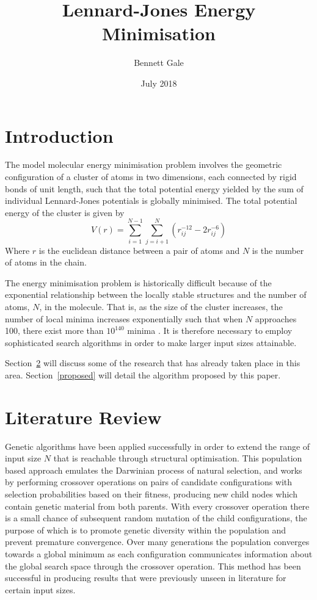 \documentclass{article}
\title{Lennard-Jones Energy Minimisation}
\author{Bennett Gale}
\date{July 2018}
\begin{document}
\maketitle
\tableofcontents
\pagebreak

\section{Introduction}

The model molecular energy minimisation problem involves the geometric
configuration of a cluster of atoms in two dimensions, each connected by rigid
bonds of unit length, such that the total potential energy yielded by the sum of
individual Lennard-Jones potentials is globally minimised. The total potential
energy of the cluster is given by 
$$V(r)=\sum^{N-1}_{i=1}\sum^{N}_{j=i+1}\left(r^{-12}_{ij}-2r^{-6}_{ij}\right)$$
Where $r$ is the euclidean distance between a pair of atoms and $N$ is the
number of atoms in the chain.

The energy minimisation problem is historically difficult because of the
exponential relationship between the locally stable structures and the number of
atoms, $N$, in the molecule. That is, as the size of the cluster increases, the
number of local minima increases exponentially such that when $N$ approaches
100, there exist more than $10^{140}$ minima \cite{DAVEN1996195}. It is
therefore necessary to employ sophisticated search algorithms in order to make
larger input sizes attainable.

Section~\ref{litreview} will discuss some of the research that has already taken
place in this area. Section~\ref{proposed} will detail the algorithm proposed by
this paper.

\section{Literature Review} \label{litreview}

Genetic algorithms have been applied \cite{doi:10.1002/qua.560440214,
PULLAN1998331} successfully in order to extend the range of input size $N$ that
is reachable through structural optimisation. This population based approach
emulates the Darwinian process of natural selection, and works by performing
crossover operations on pairs of candidate configurations with selection
probabilities based on their fitness, producing new child nodes which contain
genetic material from both parents. With every crossover operation there is a
small chance of subsequent random mutation of the child configurations, the
purpose of which is to promote genetic diversity within the population and
prevent premature convergence. Over many generations the population converges
towards a global minimum as each configuration communicates
information about the global search space through the crossover operation. This
method has been successful in producing results that were previously unseen in
literature for certain input sizes.
\end{document}
